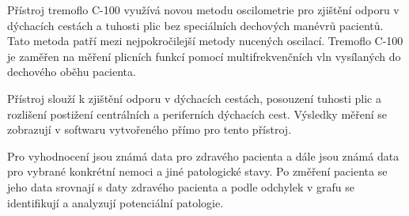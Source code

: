 Přístroj tremoflo C-100 využívá novou metodu oscilometrie pro zjištění odporu  v dýchacích cestách a tuhosti plic bez speciálních dechových manévrů pacientů. Tato metoda patří mezi nejpokročilejší metody nucených oscilací. Tremoflo C-100 je zaměřen na měření plicních funkcí pomocí multifrekvenčních vln vysílaných do dechového oběhu pacienta. \cite{Nasinec}

Přístroj slouží k zjištění odporu v dýchacích cestách, posouzení tuhosti plic a rozlišení postižení centrálních a periferních dýchacích cest. Výsledky měření se zobrazují v softwaru vytvořeného přímo pro tento přístroj. \cite{Nasinec}

Pro vyhodnocení jsou známá data pro zdravého pacienta a dále jsou známá data pro vybrané konkrétní nemoci a jiné patologické stavy.  Po změření pacienta se jeho data srovnají s daty zdravého pacienta a podle odchylek v grafu se identifikují a analyzují potenciální patologie. 
